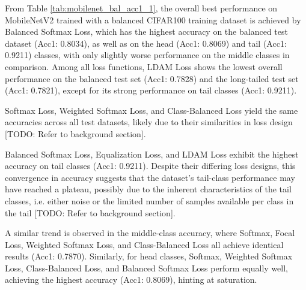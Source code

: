 From Table \ref{tab:mobilenet_bal_acc1_1}, the overall best performance on MobileNetV2 trained with a balanced CIFAR100 training dataset is achieved by Balanced Softmax Loss, which has the highest accuracy on the balanced test dataset (Acc1: 0.8034), as well as on the head (Acc1: 0.8069) and tail (Acc1: 0.9211) classes, with only slightly worse performance on the middle classes in comparison. Among all loss functions, LDAM Loss shows the lowest overall performance on the balanced test set (Acc1: 0.7828) and the long-tailed test set (Acc1: 0.7821), except for its strong performance on tail classes (Acc1: 0.9211). %

Softmax Loss, Weighted Softmax Loss, and Class-Balanced Loss yield the same accuracies across all test datasets, likely due to their similarities in loss design [TODO: Refer to background section].

Balanced Softmax Loss, Equalization Loss, and LDAM Loss exhibit the highest accuracy on tail classes (Acc1: 0.9211). Despite their differing loss designs, this convergence in accuracy suggests that the dataset's tail-class performance may have reached a plateau, possibly due to the inherent characteristics of the tail classes, i.e. either noise or the limited number of samples available per class in the tail [TODO: Refer to background section].

A similar trend is observed in the middle-class accuracy, where Softmax, Focal Loss, Weighted Softmax Loss, and Class-Balanced Loss all achieve identical results (Acc1: 0.7870). Similarly, for head classes, Softmax, Weighted Softmax Loss, Class-Balanced Loss, and Balanced Softmax Loss perform equally well, achieving the highest accuracy (Acc1: 0.8069), hinting at saturation.  %







